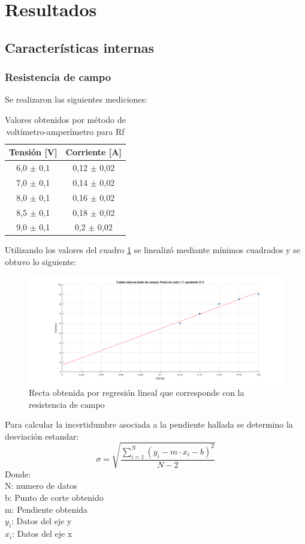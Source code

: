 \documentclass[11pt,letterpaper]{article}     %
\begin{document}
\section{Resultados}
\subsection{Características internas}
\subsubsection{Resistencia de campo}
Se realizaron las siguientes mediciones:
\begin{table}[H]
	\centering
	\caption{Valores obtenidos por método de voltímetro-amperímetro para Rf}
	\label{VoltimetroAmperimetroRf}
	\begin{tabular}{|c|c|}
		\hline
		\textbf{Tensión {[}V{]}} & \textbf{Corriente {[}A{]}} \\ \hline
		6,0 $\pm$ 0,1            & 0,12 $\pm$ 0,02            \\ \hline
		7,0 $\pm$ 0,1            & 0,14 $\pm$ 0,02            \\ \hline
		8,0 $\pm$ 0,1            & 0,16 $\pm$ 0,02            \\ \hline
		8,5 $\pm$ 0,1            & 0,18 $\pm$ 0,02            \\ \hline
		9,0 $\pm$ 0,1            & 0,2 $\pm$ 0,02             \\ \hline
	\end{tabular}
\end{table}
Utilizando los valores del cuadro \ref{VoltimetroAmperimetroRf} se linealizó mediante mínimos cuadrados y se obtuvo lo siguiente:
\begin{figure}[H]
	\centering
	\includegraphics[scale=0.5]{./recursos-Lab6/caidasInternasCAMPO.png}
	\caption{Recta obtenida por regresión lineal que corresponde con la resistencia de campo}
	\label{fig:rectaResistenciaCampo}
\end{figure}
Para calcular la incertidumbre asociada a la pendiente hallada se determino la desviación estandar:
\begin{equation}
	\sigma = \sqrt{\frac{\sum_{i=1}^{N}(y_{i}-m\cdot x_{i}-b)^{2}}{N-2}} \label{desvEstandar}
\end{equation}
Donde:\\
N: numero de datos\\
b: Punto de corte obtenido\\
m: Pendiente obtenida\\
$y_{i}$: Datos del eje y\\
$x_{i}$: Datos del eje x
\end{document}
